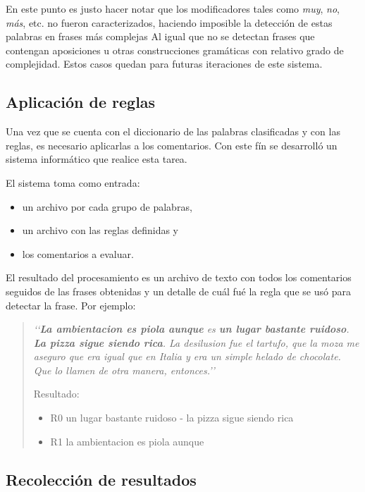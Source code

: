 En este punto es justo hacer notar que los modificadores tales como \emph{muy}, \emph{no}, \emph{más}, etc. no fueron caracterizados, haciendo imposible la detección de estas palabras en frases más complejas  Al igual que no se detectan frases que contengan aposiciones u otras construcciones gramáticas con relativo grado de complejidad. Estos casos quedan para futuras iteraciones de este sistema.

\subsection{Aplicación de reglas}

Una vez que se cuenta con el diccionario de las palabras clasificadas y con las reglas, es necesario aplicarlas a los comentarios. Con este fín se desarrolló un sistema informático que realice esta tarea.

El sistema toma como entrada:
\begin{itemize}
\item un archivo por cada grupo de palabras,
\item un archivo con las reglas definidas y
\item los comentarios a evaluar.
\end{itemize}

El resultado del procesamiento es un archivo de texto con todos los comentarios seguidos de las frases obtenidas y un detalle de cuál fué la regla que se usó para detectar la frase.
Por ejemplo:

\begin{quotation}
\emph{
\lq{}\lq{}{\bf La ambientacion es piola aunque} es {\bf un lugar bastante ruidoso}. {\bf  La pizza sigue siendo rica}. La desilusion fue el tartufo, que la moza me aseguro que era igual que en Italia y era un simple helado de chocolate.  Que lo llamen de otra manera, entonces.\rq{}\rq{}
}

Resultado:
\begin{itemize}
\item R0  un lugar bastante ruidoso - la pizza sigue siendo rica
\item R1  la ambientacion es piola aunque
\end{itemize}

\end{quotation}

\subsection{Recolección de resultados}

